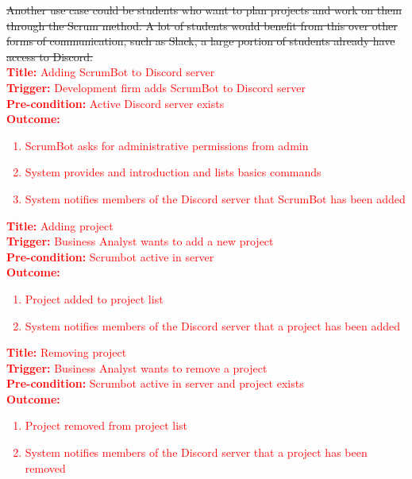 \documentclass[12pt, titlepage]{article}
\begin{document}
\sout{Another use case could be students who want to plan projects and work on them through the Scrum method. A lot of students would benefit from this over other forms of communication, such as Slack, a large portion of students already have access to Discord.}\\

\noindent \textcolor{red}{\textbf{Title: }Adding ScrumBot to Discord server}\\
\textcolor{red}{\textbf{Trigger: }Development firm adds ScrumBot to Discord server}\\
\textcolor{red}{\textbf{Pre-condition: }Active Discord server exists}\\
\textcolor{red}{\textbf{Outcome: }}
\textcolor{red}{
\begin{enumerate}
    \item ScrumBot asks for administrative permissions from admin
    \item System provides and introduction and lists basics commands
    \item System notifies members of the Discord server that ScrumBot has been added
\end{enumerate}
}

\noindent \textcolor{red}{\textbf{Title: }Adding project}\\
\textcolor{red}{\textbf{Trigger: }Business Analyst wants to add a new project}\\
\textcolor{red}{\textbf{Pre-condition: }Scrumbot active in server}\\
\textcolor{red}{\textbf{Outcome: }}
\textcolor{red}{
\begin{enumerate}
    \item Project added to project list
    \item System notifies members of the Discord server that a project has been added
\end{enumerate}
}

\noindent \textcolor{red}{\textbf{Title: }Removing project}\\
\textcolor{red}{\textbf{Trigger: }Business Analyst wants to remove a project}\\
\textcolor{red}{\textbf{Pre-condition: }Scrumbot active in server and project exists}\\
\textcolor{red}{\textbf{Outcome: }}
\textcolor{red}{
\begin{enumerate}
    \item Project removed from project list
    \item System notifies members of the Discord server that a project has been removed
\end{enumerate}
}
\end{document}
